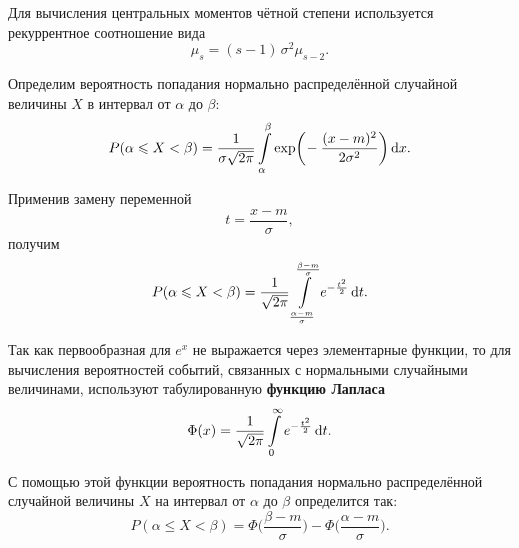 \documentclass[a4paper]{article}
\DeclareMathOperator{\expo}{exp}
\newcommand{\sleq}{\leqslant}
\newcommand{\sqrtt}[1]{\sqrt{\vphantom{qb} #1}}
\newcommand{\key}[1]{{\color{Medium}\bfseries #1}}
\begin{document}
                    Для вычисления центральных моментов чётной степени используется рекуррентное соотношение вида
                    \begin{equation*}
                        \mu_s = (s - 1) \, \sigma^2 \mu_{s - 2} .
                    \end{equation*}

                    Определим вероятность попадания нормально распределённой случайной величины $X$ в интервал от $\alpha$ до $\beta$:
                    \begin{equation*}
                        P(\alpha \sleq X < \beta) = \frac{1}{\sigma \sqrtt{2 \pi}}
                            \int\limits_{\alpha}^{\beta}  \expo \! \bigg( \!
                            -\frac{(x - m)^2}{2 \sigma^2} \bigg) \dif x .
                    \end{equation*}

                    Применив замену переменной
                    \begin{equation*}
                        t = \frac{x - m}{\sigma} ,
                    \end{equation*}
                    получим
                    \begin{equation*}
                        P(\alpha \sleq X < \beta) = \frac{1}{\sqrtt{2 \pi}}
                            \int\limits_{\frac{\alpha - m}{\sigma}}^{\frac{\beta - m}{\sigma}}
                            e^{-\frac{t^\text{\tiny 2}}{2}} \dif t .
                    \end{equation*}

                    Так как первообразная для $e^x$ не выражается через элементарные функции, то для вычисления вероятностей событий, связанных с нормальными случайными величинами, используют табулированную \key{функцию Лапласа}
                    \begin{equation*}
                        \Phi (x) = \frac{1}{\sqrtt{2 \pi}}
                            \int\limits_{0}^{\infty} e^{-\frac{t^\text{\tiny 2}}{2}} \dif t .
                    \end{equation*}

                    С помощью этой функции вероятность попадания нормально распределённой случайной величины $X$ на интервал от $\alpha$ до $\beta$ определится так:
                    \begin{equation*}
                        P(\alpha \sleq X < \beta) =
                            \Phi \Big( \frac{\beta - m}{\sigma} \Big) -
                            \Phi \Big( \frac{\alpha - m}{\sigma} \Big) .
                    \end{equation*}
\end{document}
